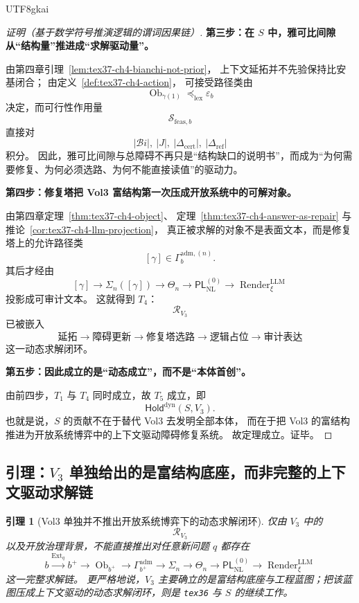 \documentclass[12pt]{article}
\newtheorem{lemma}{引理}[section]
\newcommand{\Render}{\operatorname{Render}}
\begin{document}
\begin{CJK*}{UTF8}{gkai}
\begin{proof}[证明（基于数学符号推演逻辑的谓词因果链）]
\textbf{第三步：在 $S$ 中，雅可比间隙从“结构量”推进成“求解驱动量”。}

由第四章引理~\ref{lem:tex37-ch4-bianchi-not-prior}，
上下文延拓并不先验保持比安基闭合；
由定义~\ref{def:tex37-ch4-action}，
可接受路径类由
\[
  \operatorname{Ob}_{\gamma(1)}
  \preceq_{\mathrm{lex}}
  \varepsilon_b
\]
决定，而可行性作用量
\[
  \mathcal{S}_{\mathrm{feas},b}
\]
直接对
\[
  |\mathcal{B}\!i|,
  \ |J|,
  \ |\Delta_{\mathrm{cert}}|,
  \ |\Delta_{\mathrm{ref}}|
\]
积分。
因此，雅可比间隙与总障碍不再只是“结构缺口的说明书”，而成为“为何需要修复、为何必须选路、为何不能直接读值”的驱动力。

\textbf{第四步：修复塔把 Vol3 富结构第一次压成开放系统中的可解对象。}

由第四章定理~\ref{thm:tex37-ch4-object}、
定理~\ref{thm:tex37-ch4-answer-as-repair} 与
推论~\ref{cor:tex37-ch4-llm-projection}，
真正被求解的对象不是表面文本，而是修复塔上的允许路径类
\[
  [\gamma]\in \Gamma_b^{\mathrm{adm},(n)}.
\]
其后才经由
\[
  [\gamma]
  \to
  \Sigma_n([\gamma])
  \to
  \Theta_n
  \to
  \mathsf{PL}_{\mathrm{NL}}^{(0)}
  \to
  \Render^{\mathrm{LLM}}_\xi
\]
投影成可审计文本。
这就得到 $T_4$：
\[
  \mathcal R_{V_3}
\]
已被嵌入
\[
  \text{延拓}
  \to
  \text{障碍更新}
  \to
  \text{修复塔选路}
  \to
  \text{逻辑占位}
  \to
  \text{审计表达}
\]
这一动态求解闭环。

\textbf{第五步：因此成立的是“动态成立”，而不是“本体首创”。}

由前四步，$T_1$ 与 $T_4$ 同时成立，故 $T_5$ 成立，即
\[
  \mathsf{Hold}^{\mathrm{dyn}}(S,V_3).
\]
也就是说，$S$ 的贡献不在于替代 Vol3 去发明全部本体，
而在于把 Vol3 的富结构推进为开放系统博弈中的上下文驱动障碍修复系统。
故定理成立。证毕。
\end{proof}

\subsection{引理：$V_3$ 单独给出的是富结构底座，而非完整的上下文驱动求解链}
\label{subsec:tex37-ch19-lemma}

\begin{lemma}[Vol3 单独并不推出开放系统博弈下的动态求解闭环]
\label{lem:tex37-ch19-static-vs-dynamic}
仅由 $V_3$ 中的
\[
  \mathcal R_{V_3}
\]
以及开放治理背景，不能直接推出对任意新问题 $q$ 都存在
\[
  b
  \xrightarrow{\operatorname{Ext}_q}
  b^+
  \to
  \operatorname{Ob}_{b^+}
  \to
  \Gamma_{b^+}^{\mathrm{adm}}
  \to
  \Sigma_n
  \to
  \Theta_n
  \to
  \mathsf{PL}_{\mathrm{NL}}^{(0)}
  \to
  \Render^{\mathrm{LLM}}_\xi
\]
这一完整求解链。
更严格地说，$V_3$ 主要确立的是富结构底座与工程蓝图；把该蓝图压成上下文驱动的动态求解闭环，则是
\texttt{tex36} 与 $S$ 的继续工作。
\end{lemma}


\end{CJK*}
\end{document}
